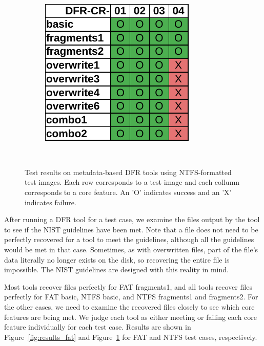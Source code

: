 \begin{figure}
\begin{subfigure}{0.3\linewidth}
    \end{subfigure}~~
    \begin{subfigure}{0.3\linewidth}
        \includegraphics[width=\linewidth]{fig/axiom_results_ntfs.pdf}
    \end{subfigure}~~
        
    \caption{Test results on metadata-based DFR tools using NTFS-formatted test images. Each row corresponds to a test image and each collumn corresponds to a core feature. An 'O' indicates success and an 'X' indicates failure.}
    \label{fig:results_ntfs}
\end{figure}


After running a DFR tool for a test case, we examine the files output by the tool to see if the NIST guidelines have been met.
Note that a file does not need to be perfectly recovered for a tool to meet the guidelines, although all the guidelines would be met in that case.
Sometimes, as with overwritten files, part of the file's data literally no longer exists on the disk, so recovering the entire file is impossible.
The NIST guidelines are designed with this reality in mind.

Most tools recover files perfectly for FAT fragments1, and all tools recover files perfectly for FAT basic, NTFS basic, and NTFS fragments1 and fragments2.
For the other cases, we need to examine the recovered files closely to see which core features are being met.
We judge each tool as either meeting or failing each core feature individually for each test case.
Results are shown in Figure~\ref{fig:results_fat} and Figure~\ref{fig:results_ntfs} for FAT and NTFS test cases, respectively.

